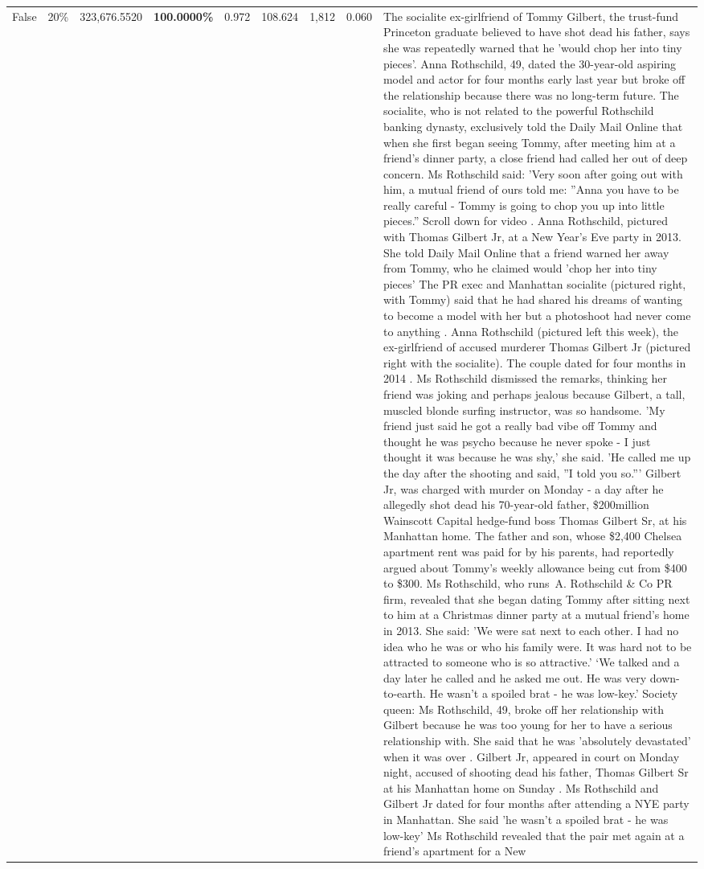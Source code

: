 \begin{table}[H]
\begin{tabular}{lllrlllll}
False & 20\% & 323,676.5520 & \bfseries \color{red} 100.0000\% & 0.972 & 108.624 & 1,812 & 0.060 & The socialite ex-girlfriend of Tommy Gilbert, the trust-fund Princeton graduate believed to have shot dead his father, says she was repeatedly warned that he 'would chop her into tiny pieces'. Anna Rothschild, 49, dated the 30-year-old aspiring model and actor for four months early last year but broke off the relationship because there was no long-term future. The socialite, who is not related to the powerful Rothschild banking dynasty, exclusively told the Daily Mail Online that when she first began seeing Tommy, after meeting him at a friend's dinner party, a close friend had called her out of deep concern. Ms Rothschild said: 'Very soon after going out with him, a mutual friend of ours told me: ''Anna you have to be really careful - Tommy is going to chop you up into little pieces.'' Scroll down for video . Anna Rothschild, pictured with Thomas Gilbert Jr, at a New Year's Eve party in 2013. She told Daily Mail Online that a friend warned her away from Tommy, who he claimed would 'chop her into tiny pieces' The PR exec and Manhattan socialite (pictured right, with Tommy) said that he had shared his dreams of wanting to become a model with her but a photoshoot had never come to anything . Anna Rothschild (pictured left this week), the ex-girlfriend of accused murderer Thomas Gilbert Jr (pictured right with the socialite). The couple dated for four months in 2014 . Ms Rothschild dismissed the remarks, thinking her friend was joking and perhaps jealous because Gilbert, a tall, muscled blonde surfing instructor, was so handsome. 'My friend just said he got a really bad vibe off Tommy and thought he was psycho because he never spoke - I just thought it was because he was shy,' she said. 'He called me up the day after the shooting and said, ''I told you so.''' Gilbert Jr, was charged with murder on Monday - a day after he allegedly shot dead his 70-year-old father, \$200million Wainscott Capital hedge-fund boss Thomas Gilbert Sr, at his Manhattan home. The father and son, whose \$2,400 Chelsea apartment rent was paid for by his parents, had reportedly argued about Tommy's weekly allowance being cut from \$400 to \$300. Ms Rothschild, who runs A. Rothschild \& Co PR firm, revealed that she began dating Tommy after sitting next to him at a Christmas dinner party at a mutual friend's home in 2013. She said: 'We were sat next to each other. I had no idea who he was or who his family were. It was hard not to be attracted to someone who is so attractive.' ‘We talked and a day later he called and he asked me out. He was very down-to-earth. He wasn’t a spoiled brat - he was low-key.’ Society queen: Ms Rothschild, 49, broke off her relationship with Gilbert because he was too young for her to have a serious relationship with. She said that he was 'absolutely devastated' when it was over . Gilbert Jr, appeared in court on Monday night, accused of shooting dead his father, Thomas Gilbert Sr at his Manhattan home on Sunday . Ms Rothschild and Gilbert Jr dated for four months after attending a NYE party in Manhattan. She said 'he wasn't a spoiled brat - he was low-key' Ms Rothschild revealed that the pair met again at a friend’s apartment for a New 
\end{tabular}
\end{table}
